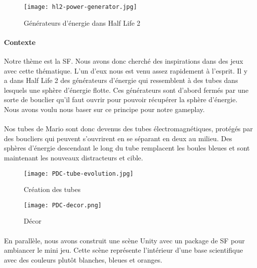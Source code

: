 \begin{wrapfigure}[13]{l}{6cm}
    \vspace{-10pt}
    \texttt{[image: hl2-power-generator.jpg]}
    \captionsetup{labelformat=simpleNumber}
    \caption{Générateurs d'énergie dans Half Life 2}
\end{wrapfigure}

\paragraph{Contexte}Notre thème est la \gls{SF}. Nous avons donc cherché des inspirations dans des jeux avec cette thématique. L'un d'eux nous est venu assez rapidement à l'esprit.
Il y a dans Half Life 2 des générateurs d'énergie qui ressemblent à des tubes dans lesquels une sphère d'énergie flotte. Ces générateurs sont d'abord fermés par une sorte de bouclier
qu'il faut ouvrir pour pouvoir récupérer la sphère d'énergie. Nous avons voulu nous baser sur ce principe pour notre gameplay.

\paragraph{}Nos tubes de Mario sont donc devenus des tubes électromagnétiques, protégés par des boucliers qui peuvent s'ouvrirent en se séparant en deux au milieu. Des sphères
d'énergie descendant le long du tube remplacent les boules bleues et sont maintenant les nouveaux distracteurs et cible.

\begin{figure}[H]
    \begin{center}
    \texttt{[image: PDC-tube-evolution.jpg]}
    \end{center}
    \caption{Création des tubes}
\label{TubeEvolution}
\end{figure}

\begin{wrapfigure}[5]{r}{5cm}
    \vspace{-25pt}
    \texttt{[image: PDC-decor.png]}
    \captionsetup{labelformat=simpleNumber}
    \caption{Décor}
\end{wrapfigure}

\paragraph{}En parallèle, nous avons construit une scène Unity avec un package de \gls{SF} pour ambiancer le mini jeu. Cette scène représente l'intérieur d'une base scientifique avec
des couleurs plutôt blanches, bleues et oranges.


